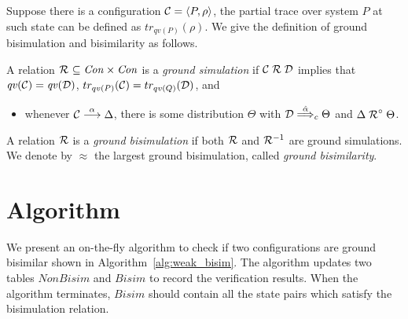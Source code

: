 \documentclass[a4paper,runningheads]{llncs}
\newcommand{\lift}[1]{\mathrel{{#1}^\circ}}
\newcommand{\Con}{{\it Con}}
\newcommand{\qv}{{\it qv}}
\newcommand{\CC}{{\cal C}}
\newcommand{\CD}{{\cal D}}
\begin{document}
Suppose there is a configuration $\CC=\langle P,\rho\rangle$, the partial trace over system $P$ at such state can be defined as $tr_{qv(P)}(\rho)$. We give the definition of ground bisimulation and bisimilarity as follows. 
\begin{definition}[\cite{DF12}]
	A relation $\aRel\ \subseteq \Con\times\Con$ is a \emph{ground simulation} if
	$\CC\aRel \CD$ implies that $\qv(\CC)=\qv(\CD)$, $tr_{qv(P)}(\CC)=tr_{qv(Q)}(\CD)$,
	and
	\begin{itemize}
		\item whenever $\CC\ar{\alpha} \Delta$, there is some distribution $\Theta$ with $\CD\dar{\hat{\alpha}}_{c}\Theta$ and $\Delta \lift{\aRel} \Theta$.
	\end{itemize}
	A relation $\mathrel{{\mathcal R }}$ is a \emph{ground bisimulation} if both $\mathrel{{\mathcal R }}$ and
	$\mathrel{{\mathcal R }}^{-1}$ are ground simulations. %
	We denote by $\approx$ the largest ground bisimulation, called \emph{ground bisimilarity}.
\end{definition}

\section{Algorithm}
\label{sec:algorithm}
We present an on-the-fly algorithm to check if two configurations are ground bisimilar shown in Algorithm~\ref{alg:weak_bisim}. The algorithm updates two tables $NonBisim$ and $Bisim$ to record the verification results. When the algorithm terminates, $Bisim$ should contain all the state pairs which satisfy the bisimulation relation.
\end{document}
